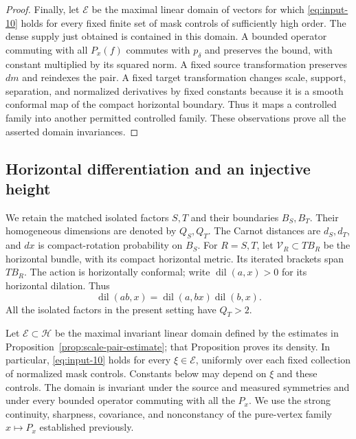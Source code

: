 \begin{proof}
Finally, let $\mathscr E$ be the maximal linear domain of vectors
for which \eqref{eq:input-10} holds for every fixed finite set
of mask controls of sufficiently high order.  The dense supply
just obtained is contained in this domain.  A bounded operator
commuting with all $P_x(f)$ commutes with $p_\delta$ and preserves
the bound, with constant multiplied by its squared norm.  A fixed
source transformation preserves $dm$ and reindexes the pair.  A
fixed target transformation changes scale, support, separation,
and normalized derivatives by fixed constants because it is a
smooth conformal map of the compact horizontal boundary.  Thus it
maps a controlled family into another permitted controlled family.
These observations prove all the asserted domain invariances.
\end{proof}

\subsection{Horizontal differentiation and an injective height}

We retain the matched isolated factors $S,T$ and their boundaries
$B_S,B_T$.  Their homogeneous dimensions are denoted by $Q_S,Q_T$.  The Carnot distances are
$d_S,d_T$, and $dx$ is compact-rotation probability on $B_S$.
For $R=S,T$, let $\mathcal V_R\subset TB_R$ be the horizontal bundle,
with its compact horizontal metric.  Its iterated brackets span $TB_R$.
The action is horizontally conformal; write
$\operatorname{dil}(a,x)>0$ for its horizontal dilation.  Thus
\begin{equation}\label{eq:scale-dilation-cocycle}
 \operatorname{dil}(ab,x)
 =\operatorname{dil}(a,bx)\operatorname{dil}(b,x).
\end{equation}
All the isolated factors in the present setting have $Q_T>2$.

Let $\mathscr E\subset\mathcal H$ be the maximal invariant linear domain
defined by the estimates in Proposition~\ref{prop:scale-pair-estimate}; that
Proposition proves its density.  In particular,
\eqref{eq:input-10} holds for every $\xi\in\mathscr E$, uniformly
over each fixed collection of normalized mask controls.  Constants
below may depend on $\xi$ and these controls.  The domain is invariant
under the source and measured symmetries and under every bounded
operator commuting with all the $P_x$.  We use the strong continuity,
sharpness, covariance, and nonconstancy of the pure-vertex family
$x\mapsto P_x$ established previously.

